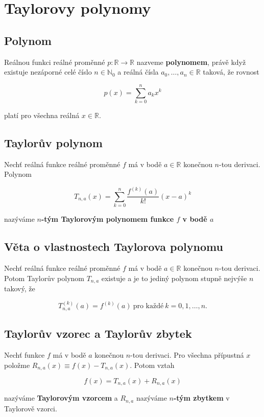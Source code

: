 \section{Taylorovy polynomy}

\subsection*{Polynom}

Reálnou funkci reálné proměnné $p: \mathbb{R} \to \mathbb{R}$ nazveme
\textbf{polynomem}, právě když existuje nezáporné celé číslo $n\in\mathbb{N}_0$
a reálná čísla $a_0, \ldots, a_n \in \mathbb{R}$ taková, že rovnost

\[ p(x) = \sum_{k=0}^n a_k x^k \]

\noindent platí pro všechna reálná $x\in\mathbb{R}$.

\subsection*{Taylorův polynom}

Nechť reálná funkce reálné proměnné $f$ má v bodě $a\in\mathbb{R}$ konečnou
$n$-tou derivaci. Polynom

\[ T_{n,a}(x) = \sum_{k=0}^n \frac{f^{(k)}(a)}{k!} (x-a)^k \]

\noindent nazýváme \textbf{$n$-tým Taylorovým polynomem funkce $f$ v bodě $a$}

\subsection*{Věta o vlastnostech Taylorova polynomu}

Nechť reálná funkce reálné proměnné $f$ má v bodě $a\in\mathbb{R}$ konečnou
$n$-tou derivaci. Potom Taylorův polynom $T_{n,a}$ existuje a je to jediný
polynom stupně nejvýše $n$ takový, že

\[ T_{n,a}^{(k)}(a) = f^{(k)}(a) \ \text{pro každé} \ k=0,1,\ldots,n. \]

\subsection*{Taylorův vzorec a Taylorův zbytek}

Nechť funkce $f$ má v bodě $a$ konečnou $n$-tou derivaci. Pro všechna přípustná
$x$ položme $R_{n,a}(x) \equiv f(x) - T_{n,a}(x)$. Potom vztah

\[ f(x) = T_{n,a}(x) + R_{n,a}(x) \]

\noindent nazýváme \textbf{Taylorovým vzorcem} a $R_{n,a}$ nazýváme \textbf{$n$-tým zbytkem} v Taylorově vzorci.


